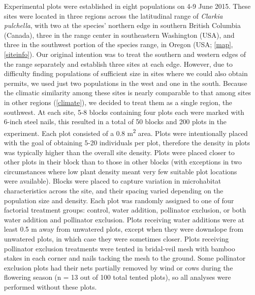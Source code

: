 \documentclass{article}
\begin{document}
Experimental plots were established in eight populations on 4-9 June 2015. These sites were located in three regions across the latitudinal range of \textit{Clarkia pulchella}, with two at the species' northern edge in southern British Columbia (Canada), three in the range center in southeastern Washington (USA), and three in the southwest portion of the species range, in Oregon (USA; \autoref{map}, \autoref{siteinfo}). Our original intention was to treat the southern and western edges of the range separately and establish three sites at each edge. However, due to difficulty finding populations of sufficient size in sites where we could also obtain permits, we used just two populations in the west and one in the south. Because the climatic similarity among these sites is nearly comparable to that among sites in other regions (\autoref{climate}), we decided to treat them as a single region, the southwest. At each site, 5-8 blocks containing four plots each were marked with 6-inch steel nails, this resulted in a total of 50 blocks and 200 plots in the experiment. Each plot consisted of a 0.8 m\textsuperscript{2} area. Plots were intentionally placed with the goal of obtaining 5-20 individuals per plot, therefore the density in plots was typically higher than the overall site density. Plots were placed closer to other plots in their block than to those in other blocks (with exceptions in two circumstances where low plant density meant very few suitable plot locations were available). Blocks were placed to capture variation in microhabitat characteristics across the site, and their spacing varied depending on the population size and density. Each plot was randomly assigned to one of four factorial treatment groups: control, water addition, pollinator exclusion, or both water addition and pollinator exclusion. Plots receiving water additions were at least 0.5 m away from unwatered plots, except when they were downslope from unwatered plots, in which case they were sometimes closer. Plots receiving pollinator exclusion treatments were tented in bridal-veil mesh with bamboo stakes in each corner and nails tacking the mesh to the ground. Some pollinator exclusion plots had their nets partially removed by wind or cows during the flowering season (n = 13 out of 100 total tented plots), so all analyses were performed without these plots. 
\end{document}
